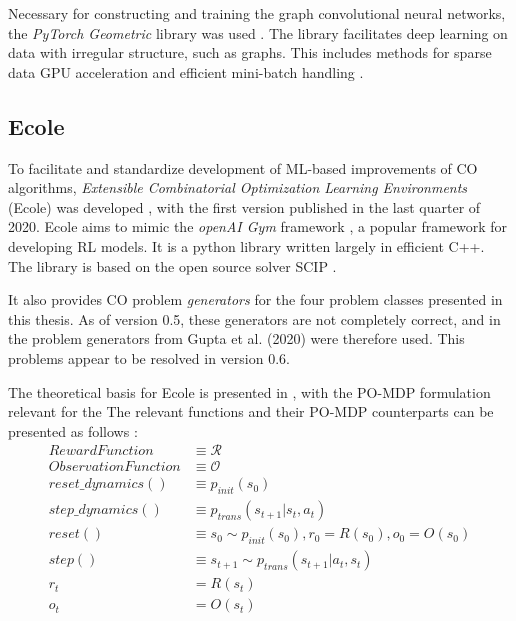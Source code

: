 Necessary for constructing and training the graph convolutional neural networks, the \textit{PyTorch Geometric} library was used \cite{fey2019pytorchgeometric}. The library facilitates deep learning on data with irregular structure, such as graphs. This includes methods for sparse data GPU acceleration and efficient mini-batch handling \cite{fey2019pytorchgeometric}. 




\subsection{Ecole}\label{ssec:ecole}

To facilitate and standardize development of \gls{ML}-based improvements of \gls{CO} algorithms, \textit{Extensible Combinatorial Optimization Learning Environments} (\gls{Ecole}) was developed \cite{prouvost2020ecole}, with the first version published in the last quarter of 2020. \gls{Ecole} aims to mimic the \textit{openAI Gym} framework \cite{brockman2016openai}, a popular framework for developing \gls{RL} models. It is a python library written largely in efficient C++. 
The library is based on the open source solver \gls{SCIP} \cite{achterberg2009scip}.


It also provides \gls{CO} problem \textit{generators} for the four problem classes presented in this thesis. As of version 0.5, these generators are not completely correct, and in the problem generators from Gupta et al. (2020) \cite{gupta2020hybrid} were therefore used. This problems appear to be resolved in version 0.6.  


The theoretical basis for \gls{Ecole} is presented in , with the \gls{PO-MDP} formulation relevant for the  
The relevant functions and their \gls{PO-MDP} counterparts can be presented as follows \cite{prouvost2020ecole}:
\begin{align*}
    RewardFunction &\equiv \mathcal{R}\\
ObservationFunction &\equiv \mathcal{O}\\
reset\_dynamics() &\equiv p_\textit{init}(s_0)\\
step\_dynamics() &\equiv p_\textit{trans}(s_{t+1}|s_t,a_t)\\
reset() &\equiv s_0 \sim p_\textit{init}(s_0), r_0=R(s_0), o_0=O(s_0)\\ 
step() &\equiv s_{t+1} \sim p_\textit{trans}(s_{t+1}|a_t,s_t)\\ r_t&=R(s_t)\\ o_t&=O(s_t)
\end{align*}





